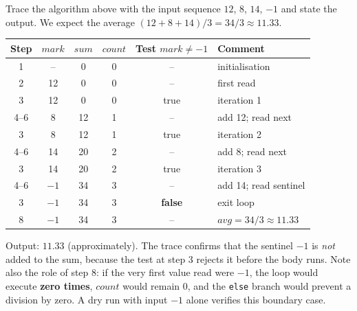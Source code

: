 \documentclass[11pt]{article}
\begin{document}
\begin{exoresolu}
Trace the algorithm above with the input sequence $12$, $8$, $14$, $-1$ and state the output.
\tcblower
We expect the average $(12 + 8 + 14)/3 = 34/3 \approx 11.33$.

\begin{center}
\begin{tabular}{|c|c|c|c|c|l|}
\hline
\rowcolor{popblueL} Step & $mark$ & $sum$ & $count$ & Test $mark \neq -1$ & Comment \\
\hline
1 & -- & 0 & 0 & -- & initialisation \\
\hline
2 & 12 & 0 & 0 & -- & first read \\
\hline
3 & 12 & 0 & 0 & true & iteration 1 \\
\hline
4--6 & 8 & 12 & 1 & -- & add 12; read next \\
\hline
3 & 8 & 12 & 1 & true & iteration 2 \\
\hline
4--6 & 14 & 20 & 2 & -- & add 8; read next \\
\hline
3 & 14 & 20 & 2 & true & iteration 3 \\
\hline
4--6 & $-1$ & 34 & 3 & -- & add 14; read sentinel \\
\hline
3 & $-1$ & 34 & 3 & \textbf{false} & exit loop \\
\hline
8 & $-1$ & 34 & 3 & -- & $avg = 34/3 \approx 11.33$ \\
\hline
\end{tabular}
\end{center}

Output: $11.33$ (approximately). The trace confirms that the sentinel $-1$ is \emph{not} added to the sum, because the test at step 3 rejects it before the body runs. Note also the role of step 8: if the very first value read were $-1$, the loop would execute \textbf{zero times}, $count$ would remain 0, and the \texttt{else} branch would prevent a division by zero. A dry run with input $-1$ alone verifies this boundary case.
\end{exoresolu}
\end{document}
